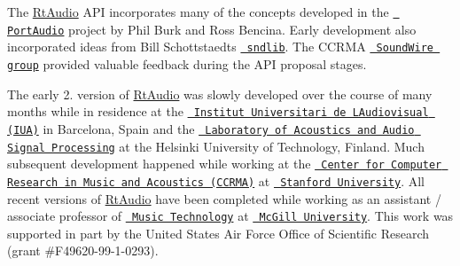 The \mbox{\hyperlink{class_rt_audio}{Rt\+Audio}} A\+PI incorporates many of the concepts developed in the \href{http://www.portaudio.com/}{\texttt{ Port\+Audio}} project by Phil Burk and Ross Bencina. Early development also incorporated ideas from Bill Schottstaedt\textquotesingle{}s \href{http://www-ccrma.stanford.edu/software/snd/sndlib/}{\texttt{ sndlib}}. The C\+C\+R\+MA \href{http://www-ccrma.stanford.edu/groups/soundwire/}{\texttt{ Sound\+Wire group}} provided valuable feedback during the A\+PI proposal stages.

The early 2. version of \mbox{\hyperlink{class_rt_audio}{Rt\+Audio}} was slowly developed over the course of many months while in residence at the \href{http://www.iua.upf.es/}{\texttt{ Institut Universitari de L\textquotesingle{}Audiovisual (I\+UA)}} in Barcelona, Spain and the \href{http://www.acoustics.hut.fi/}{\texttt{ Laboratory of Acoustics and Audio Signal Processing}} at the Helsinki University of Technology, Finland. Much subsequent development happened while working at the \href{http://www-ccrma.stanford.edu/}{\texttt{ Center for Computer Research in Music and Acoustics (C\+C\+R\+MA)}} at \href{http://www.stanford.edu/}{\texttt{ Stanford University}}. All recent versions of \mbox{\hyperlink{class_rt_audio}{Rt\+Audio}} have been completed while working as an assistant / associate professor of \href{http://www.music.mcgill.ca/musictech/}{\texttt{ Music Technology}} at \href{http://www.mcgill.ca/}{\texttt{ Mc\+Gill University}}. This work was supported in part by the United States Air Force Office of Scientific Research (grant \#F49620-\/99-\/1-\/0293). 